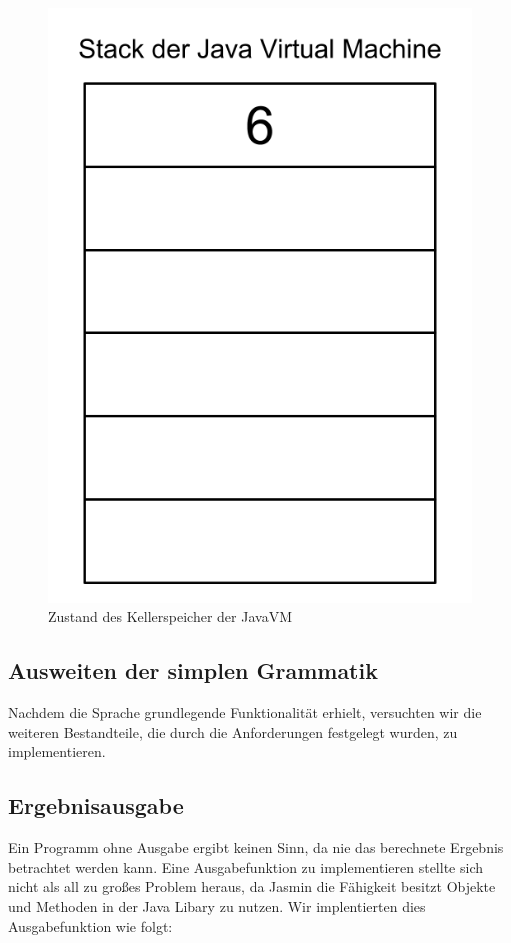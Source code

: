 \begin{figure}[h!]
\centering
\includegraphics[scale=0.2]{pics/stack_visual(3).png}
\caption{Zustand des Kellerspeicher der JavaVM}
\label{fig:method}
\end{figure}



\pagebreak

\subsection{Ausweiten der simplen Grammatik}
Nachdem die Sprache grundlegende Funktionalität erhielt, versuchten wir die weiteren Bestandteile, die durch die Anforderungen festgelegt wurden, zu implementieren. 


\subsection*{Ergebnisausgabe}
Ein Programm ohne Ausgabe ergibt keinen Sinn, da nie das berechnete Ergebnis betrachtet werden kann. Eine Ausgabefunktion zu implementieren stellte sich nicht als all zu großes Problem heraus, da Jasmin die Fähigkeit besitzt Objekte und Methoden in der Java Libary zu nutzen. Wir implentierten dies Ausgabefunktion wie folgt:

